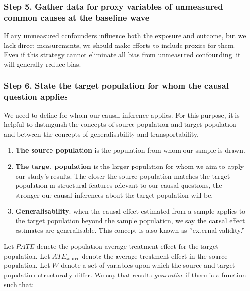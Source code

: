 \documentclass[
  singlecolumn,
  9pt]{article}
\begin{document}
\subsubsection{Step 5. Gather data for proxy variables of unmeasured
common causes at the baseline
wave}\label{step-5.-gather-data-for-proxy-variables-of-unmeasured-common-causes-at-the-baseline-wave}

If any unmeasured confounders influence both the exposure and outcome,
but we lack direct measurements, we should make efforts to include
proxies for them. Even if this strategy cannot eliminate all bias from
unmeasured confounding, it will generally reduce bias.

\subsubsection{Step 6. State the target population for whom the causal
question
applies}\label{step-6.-state-the-target-population-for-whom-the-causal-question-applies}

We need to define for whom our causal inference applies. For this
purpose, it is helpful to distinguish the concepts of source population
and target population and between the concepts of generalisability and
transportability.

\begin{enumerate}
\def\labelenumi{\arabic{enumi}.}
\item
  \textbf{The source population} is the population from whom our sample
  is drawn.
\item
  \textbf{The target population} is the larger population for whom we
  aim to apply our study's results. The closer the source population
  matches the target population in structural features relevant to our
  causal questions, the stronger our causal inferences about the target
  population will be.
\item
  \textbf{Generalisability}: when the causal effect estimated from a
  sample applies to the target population beyond the sample population,
  we say the causal effect estimates are generalisable. This concept is
  also known as ``external validity.''
\end{enumerate}

Let \(PATE\) denote the population average treatment effect for the
target population. Let \(ATE_{\text{source}}\) denote the average
treatment effect in the source population. Let \(W\) denote a set of
variables upon which the source and target population structurally
differ. We say that results \emph{generalise} if there is a function
such that:
\end{document}
